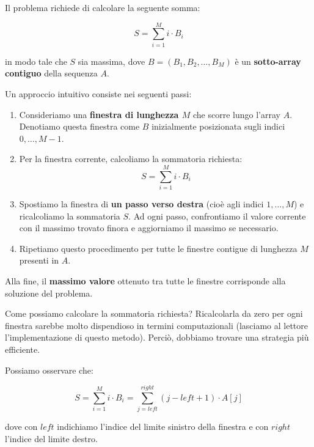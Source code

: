 Il problema richiede di calcolare la seguente somma:

\begin{equation}
	S = \sum_{i=1}^{M} i \cdot B_i
\end{equation}

in modo tale che \(S\) sia massima, dove
\(B = (B_1, B_2, \dots, B_M)\) è un \textbf{sotto-array contiguo} della sequenza \(A\).

Un approccio intuitivo consiste nei seguenti passi:

\begin{enumerate}
	\item Consideriamo una \textbf{finestra di lunghezza \(M\)} che scorre lungo l'array \(A\).  
	Denotiamo questa finestra come \(B\) inizialmente posizionata sugli indici \(0, \dots, M-1\).
	
	\item Per la finestra corrente, calcoliamo la sommatoria richiesta:
	\begin{equation}
		S = \sum_{i=1}^{M} i \cdot B_i
	\end{equation}
	
	\item Spostiamo la finestra di \textbf{un passo verso destra} (cioè agli indici \(1, \dots, M\)) e ricalcoliamo la sommatoria \(S\).  
	Ad ogni passo, confrontiamo il valore corrente con il massimo trovato finora e aggiorniamo il massimo se necessario.
	
	\item Ripetiamo questo procedimento per tutte le finestre contigue di lunghezza \(M\) presenti in \(A\).
\end{enumerate}

Alla fine, il \textbf{massimo valore} ottenuto tra tutte le finestre corrisponde alla soluzione del problema.

Come possiamo calcolare la sommatoria richiesta?  
Ricalcolarla da zero per ogni finestra sarebbe molto dispendioso in termini computazionali (lasciamo al lettore l'implementazione di questo metodo).  
Perciò, dobbiamo trovare una strategia più efficiente.

Possiamo osservare che:

\begin{equation}
	\label{prefix:Cindex:equation:S}
	S = \sum_{i=1}^{M} i \cdot B_i = \sum_{j = left}^{right} (j - left + 1) \cdot A[j]
\end{equation}

dove con \(left\) indichiamo l'indice del limite sinistro della finestra e con \(right\) l'indice del limite destro.

